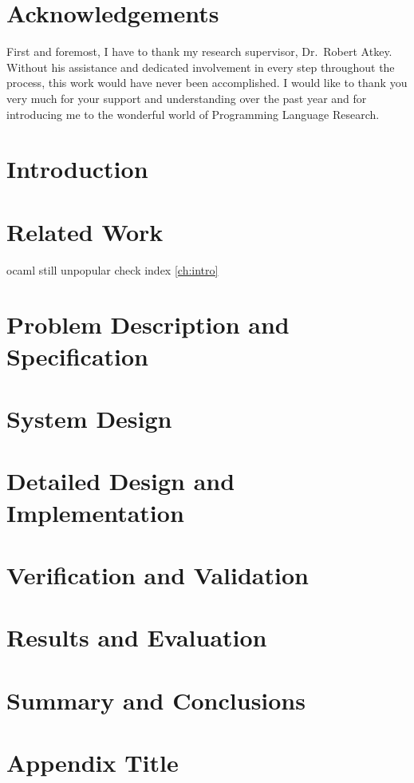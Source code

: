 \documentclass[a4paper, 12pt, oneside]{report}
\begin{document}
\chapter*{Acknowledgements} 
First and foremost, I have to thank my research supervisor,  
Dr.~Robert Atkey.
Without his assistance and dedicated 
involvement in every step throughout the process, 
this work would have never been accomplished. 
I would like to thank you very much for your 
support and understanding over the past year and for
introducing me to the wonderful world of Programming Language Research.
 
\tableofcontents


\chapter{Introduction}\label{ch:intro}


\chapter{Related Work}\label{ch:related}


ocaml still unpopular check index \autoref{ch:intro}

\chapter{Problem Description and Specification}\label{ch:spec}


\chapter{System Design}\label{ch:design}


\chapter{Detailed Design and Implementation}\label{implementation}


\chapter{Verification and Validation}\label{verification}


\chapter{Results and Evaluation}\label{evaluation}


\chapter{Summary and Conclusions}\label{conclusion}



\nocite{*}


\appendix
\chapter{Appendix Title}

\end{document}
